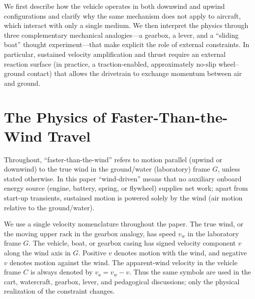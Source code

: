 \documentclass[a4paper]{article}
\begin{document}
We first describe how the vehicle operates in both downwind and upwind configurations and clarify why the same mechanism does not apply to aircraft, which interact with only a single medium. We then interpret the physics through three complementary mechanical analogies---a gearbox, a lever, and a ``sliding boat'' thought experiment---that make explicit the role of external constraints. In particular, sustained velocity amplification and thrust require an external reaction surface (in practice, a traction-enabled, approximately no-slip wheel--ground contact) that allows the drivetrain to exchange momentum between air and ground.

\section{The Physics of Faster-Than-the-Wind Travel}

Throughout, ``faster-than-the-wind'' refers to motion parallel (upwind or downwind) to the true wind in the ground/water (laboratory) frame \(G\), unless stated otherwise.
In this paper ``wind-driven'' means that no auxiliary onboard energy source
(engine, battery, spring, or flywheel) supplies net work; apart from start-up
transients, sustained motion is powered solely by the wind (air motion relative
to the ground/water).

We use a single velocity nomenclature throughout the paper. The true wind, or
the moving upper rack in the gearbox analogy, has speed \(v_w\) in the
laboratory frame \(G\).
The vehicle, boat, or gearbox casing has signed velocity component \(v\)
along the wind axis in \(G\). Positive \(v\) denotes motion with the wind,
and negative \(v\) denotes motion against the wind.
The apparent-wind velocity in the vehicle frame \(C\) is always denoted
by \(v_a=v_w-v\). Thus the same symbols are used in the cart, watercraft,
gearbox, lever, and pedagogical discussions; only the physical realization of
the constraint changes.
\end{document}
